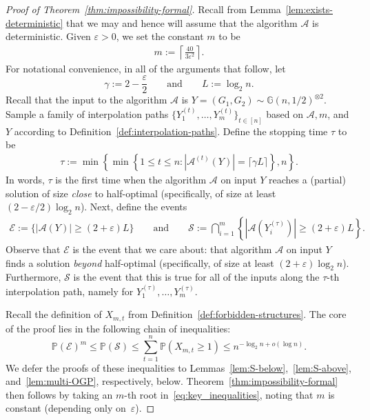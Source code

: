 \documentclass[11pt]{article}
\theoremstyle{plain}
\theoremstyle{definition}
\theoremstyle{remark}
\newcommand{\Gnhalf}{\mathbb{G}(n,1/2)}
\newcommand{\eps}{\varepsilon}
\newcommand{\Alg}{\mathcal{A}}
\newcommand{\findOneLarge}{\mathcal{E}}
\newcommand{\findManyLarge}{\mathcal{S}}
\renewcommand{\Pr}{\mathbb{P}}
\begin{document}
\begin{proof}[Proof of Theorem~\ref{thm:impossibility-formal}]
    Recall from Lemma~\ref{lem:exists-deterministic} that we may and hence will assume that the algorithm $\Alg$ is deterministic.
    Given $\eps > 0$, we set the constant $m$ to be 
    \begin{align}
        m := \left\lceil \frac{40}{3\eps^2}\right\rceil. \label{def:m}
    \end{align}
    For notational convenience, in all of the arguments that follow, let
    \[
        \gamma := 2 - \frac \eps 2 
        \qquad 
        \text{and}
        \qquad 
        L := \log_2 n. 
    \]
    Recall that the input to the algorithm $\Alg$ is $Y = (G_{1}, G_{2}) \sim \Gnhalf^{\otimes 2}$. Sample a family of interpolation paths $\{Y_1^{(t)}, \dots, Y_m^{(t)}\}_{t \in [n]}$ based on $\Alg, m$, and $Y$ according to Definition~\ref{def:interpolation-paths}. 
    Define the stopping time $\tau$ to be
    \begin{align}
        \tau := \min\left\{\min \left\{1 \leq t \leq n: \left| \Alg^{(t)} (Y) \right| = \lceil\gamma L\rceil \right\}, n\right\}. \label{def:tau}
    \end{align}
    In words, $\tau$ is the first time when the algorithm $\Alg$ on input $Y$ reaches a (partial) solution of size \emph{close} to half-optimal (specifically, of size at least $(2-\eps/2) \log_{2} n$).
    Next, define the events
    \begin{align*}
        \findOneLarge := \{|\Alg(Y)| \geq (2 + \eps)L\} %
        \qquad 
        \text{and}
        \qquad
        \findManyLarge := \bigcap_{i = 1}^m \left\{ \left| \Alg \left( Y_i^{(\tau)} \right) \right| \geq (2 + \eps)L \right\} .
    \end{align*}
    Observe that $\findOneLarge$ is the event that we care about: that algorithm $\Alg$ on input $Y$ finds a solution \emph{beyond} half-optimal (specifically, of size at least $(2+\eps) \log_{2} n$). Furthermore, $\findManyLarge$ is the event that this is true for all of the inputs along the $\tau$-th interpolation path, namely for $Y_{1}^{(\tau)}, \ldots, Y_{m}^{(\tau)}$. 
    
    Recall the definition of $X_{m,t}$ from Definition~\ref{def:forbidden-structures}. 
    The core of the proof lies in the following chain of inequalities:
    \begin{equation}\label{eq:key_inequalities}
        \Pr(\findOneLarge)^m 
        \leq \Pr(\findManyLarge) 
        \leq \sum_{t=1}^n \Pr(X_{m,t} \geq 1) 
        \leq n^{-\log_2 n + o(\log n)}.
    \end{equation}
    We defer the proofs of these inequalities to Lemmas~\ref{lem:S-below},~\ref{lem:S-above}, and~\ref{lem:multi-OGP}, respectively, below.
    Theorem~\ref{thm:impossibility-formal} then follows by taking an $m$-th root in~\eqref{eq:key_inequalities}, noting that $m$ is constant (depending only on~$\eps$). 
\end{proof}
\end{document}
